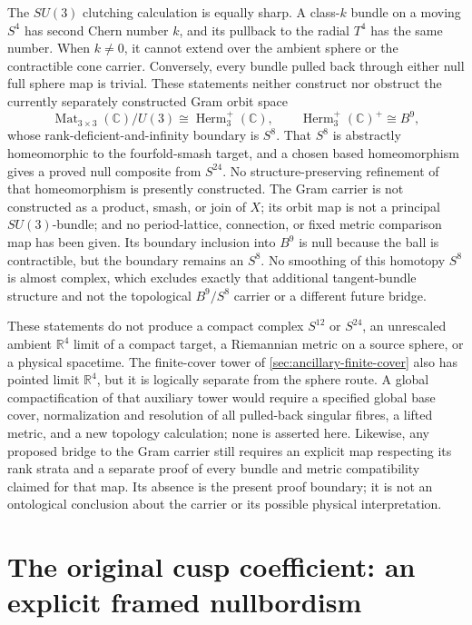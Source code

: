 \documentclass[11pt,letterpaper]{article}
\numberwithin{equation}{section}
\theoremstyle{definition}
\theoremstyle{remark}
\newcommand{\R}{\mathbb R}
\newcommand{\C}{\mathbb C}
\begin{document}
The \(SU(3)\) clutching calculation is equally sharp.  A class-\(k\)
bundle on a moving \(S^4\) has second Chern number \(k\), and its pullback
to the radial \(T^4\) has the same number.  When \(k\ne0\), it cannot extend
over the ambient sphere or the contractible cone carrier.  Conversely,
every bundle pulled back through either null full sphere map is trivial.
These statements neither construct nor obstruct the currently separately
constructed Gram orbit space
\[
 \operatorname{Mat}_{3\times3}(\C)/U(3)
 \cong\operatorname{Herm}_3^+(\C),
 \qquad
 \operatorname{Herm}_3^+(\C)^+\cong B^9,
\]
whose rank-deficient-and-infinity boundary is \(S^8\).  That \(S^8\) is
abstractly homeomorphic to the fourfold-smash target, and a chosen based
homeomorphism gives a proved null composite from \(S^{24}\).  No
structure-preserving refinement of that homeomorphism is presently
constructed.  The Gram carrier is not
constructed as a product, smash, or join of \(X\); its orbit map is not a
principal \(SU(3)\)-bundle; and no period-lattice, connection, or fixed
metric comparison map has been given.  Its boundary inclusion into \(B^9\)
is null because the ball is contractible, but the boundary remains an
\(S^8\).  No smoothing of this homotopy \(S^8\) is almost complex, which
excludes exactly that additional tangent-bundle structure and not the
topological \(B^9/S^8\) carrier or a different future bridge.

These statements do not produce a compact complex \(S^{12}\) or
\(S^{24}\), an unrescaled ambient \(\R^4\) limit of a compact target, a
Riemannian metric on a source sphere, or a physical spacetime.  The
finite-cover tower of \cref{sec:ancillary-finite-cover} also has pointed
limit \(\R^4\), but it is logically separate from the sphere route.  A
global compactification of that auxiliary tower would require a specified
global base cover, normalization and resolution of all pulled-back
singular fibres, a lifted metric, and a new topology calculation; none is
asserted here.  Likewise, any proposed bridge to the Gram carrier still
requires an explicit map respecting its rank strata and a separate proof
of every bundle and metric compatibility claimed for that map.  Its absence
is the present proof boundary; it is not an ontological conclusion about
the carrier or its possible physical interpretation.

\section{The original cusp coefficient: an explicit framed nullbordism}
\end{document}
